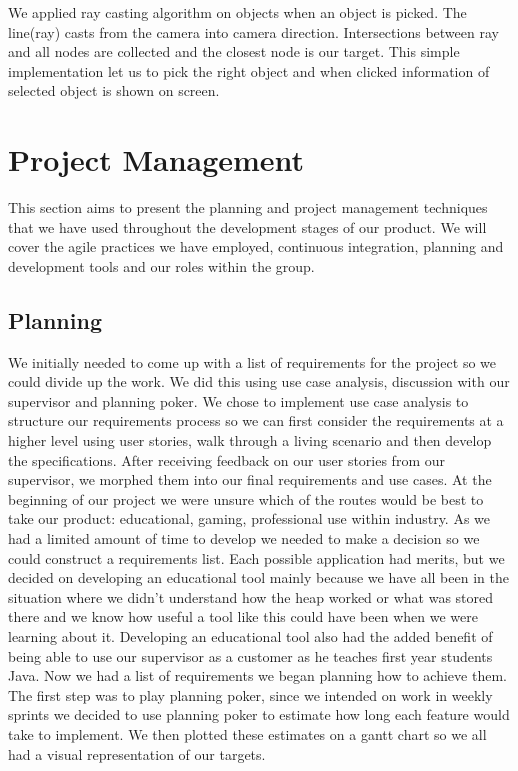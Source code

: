 \documentclass[11pt, a4paper]{report}
\begin{document}
We applied ray casting algorithm on objects when an object is picked. The line(ray) casts from the camera into camera direction. Intersections between ray and all nodes are collected and the closest node is our target. This simple implementation let us to pick the right object and when clicked information of selected object is shown on screen. 

\chapter{Project Management}

This section aims to present the planning and project management techniques that we have used throughout the development stages of our product. We will cover the agile practices we have employed, continuous integration, planning and development tools and our roles within the group. 

\section{Planning}

We initially needed to come up with a list of requirements for the project so we could divide up the work. We did this using use case analysis, discussion with our supervisor and planning poker. We chose to implement use case analysis to structure our requirements process so we can first consider the requirements at a higher level using user stories, walk through a living scenario and then develop the specifications. After receiving feedback on our user stories from our supervisor, we morphed them into our final requirements and use cases. At the beginning of our project we were unsure which of the routes would be best to take our product: educational, gaming, professional use within industry. As we had a limited amount of time to develop we needed to make a decision so we could construct a requirements list. Each possible application had merits, but we decided on developing an educational tool mainly because we have all been in the situation where we didn’t understand how the heap worked or what was stored there and we know how useful a tool like this could have been when we were learning about it. Developing an educational tool also had the added benefit of being able to use our supervisor as a customer as he teaches first year students Java. Now we had a list of requirements we began planning how to achieve them. The first step was to play planning poker, since we intended on work in weekly sprints we decided to use planning poker to estimate how long each feature would take to implement. We then plotted these estimates on a gantt chart so we all had a visual representation of our targets.
\end{document}
